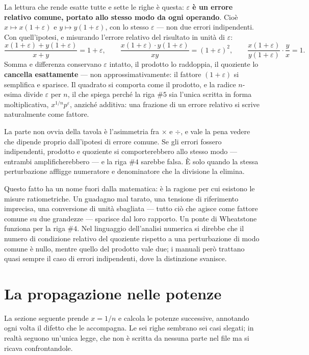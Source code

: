 La lettura che rende esatte tutte e sette le righe è questa: \textbf{$\varepsilon$ è un errore relativo comune, portato allo stesso modo da ogni operando}. Cioè $x\mapsto x(1+\varepsilon)$ e $y\mapsto y(1+\varepsilon)$, con lo stesso $\varepsilon$ — non due errori indipendenti. Con quell'ipotesi, e misurando l'errore relativo del risultato in unità di $\varepsilon$:
\[
  \frac{x(1+\varepsilon)+y(1+\varepsilon)}{x+y}=1+\varepsilon,
  \qquad
  \frac{x(1+\varepsilon)\cdot y(1+\varepsilon)}{xy}=(1+\varepsilon)^2,
  \qquad
  \frac{x(1+\varepsilon)}{y(1+\varepsilon)}\cdot\frac{y}{x}=1.
\]
Somma e differenza conservano $\varepsilon$ intatto, il prodotto lo raddoppia, il quoziente lo \textbf{cancella esattamente} — non approssimativamente: il fattore $(1+\varepsilon)$ si semplifica e sparisce. Il quadrato si comporta come il prodotto, e la radice $n$-esima divide $\varepsilon$ per $n$, il che spiega perché la riga $\#5$ sia l'unica scritta in forma moltiplicativa, $x^{1/n}p^{\varepsilon}$, anziché additiva: una frazione di un errore relativo si scrive naturalmente come fattore.

La parte non ovvia della tavola è l'asimmetria fra $\times$ e $\div$, e vale la pena vedere che dipende proprio dall'ipotesi di errore comune. Se gli errori fossero indipendenti, prodotto e quoziente si comporterebbero allo stesso modo — entrambi amplificherebbero — e la riga $\#4$ sarebbe falsa. È solo quando la stessa perturbazione affligge numeratore e denominatore che la divisione la elimina.

Questo fatto ha un nome fuori dalla matematica: è la ragione per cui esistono le misure ratiometriche. Un guadagno mal tarato, una tensione di riferimento imprecisa, una conversione di unità sbagliata — tutto ciò che agisce come fattore comune su due grandezze — sparisce dal loro rapporto. Un ponte di Wheatstone funziona per la riga $\#4$. Nel linguaggio dell'analisi numerica si direbbe che il numero di condizione relativo del quoziente rispetto a una perturbazione di modo comune è nullo, mentre quello del prodotto vale due; i manuali però trattano quasi sempre il caso di errori indipendenti, dove la distinzione svanisce.

\section{La propagazione nelle potenze}

La sezione seguente prende $x=1/n$ e calcola le potenze successive, annotando ogni volta il difetto che le accompagna. Le sei righe sembrano sei casi slegati; in realtà seguono un'unica legge, che non è scritta da nessuna parte nel file ma si ricava confrontandole.

